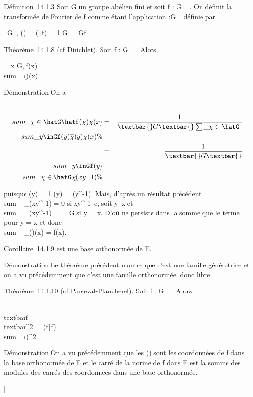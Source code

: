 \documentclass[]{article}
\begin{document}
Définition~14.1.3 Soit G un groupe abélien fini et soit f : G \rightarrow~ . On
définit la transformée de Fourier de f comme étant l'application
\hatf :\hat G \rightarrow~  définie par

\forall~\chi \in\hat G~,
\hatf(\chi) = (\chi∣f) =
1\over
\textbar{}G\textbar{}\int ~
\_Gf\overline\chi

Théorème~14.1.8 (cf Dirichlet). Soit f : G \rightarrow~ . Alors,

\forall~~x \in G, f(x) = \\sum
\_\chi\in\hatG\hatf(\chi)\chi(x)

Démonstration On a

\begin{align*} \\sum
\_\chi\in\hatG\hatf(\chi)\chi(x)&
=& 1 \over \textbar{}G\textbar{}
\sum \_\chi\in\hatG~
\\sum
\_y\inGf(y)\overline\chi(y)\chi(x)\%&
\\ & =& 1 \over
\textbar{}G\textbar{} \\sum
\_y\inGf(y)\\sum
\_\chi\in\hatG\chi(xy^-1) \%&
\\ \end{align*}

puisque \overline\chi(y) = 1 \over
\chi(y) = \chi(y^-1). Mais, d'après un résultat précédent
\\sum ~
\_\chi\in\hatG\chi(xy^-1) = 0 si
xy^-1\neq~e, soit
y\neq~x et
\\sum ~
\_\chi\in\hatG\chi(xy^-1) =
\textbar{}\hatG\textbar{} = \textbar{}G\textbar{} si
y = x. D'où ne persiste dans la somme que le terme pour y = x et donc
\\sum ~
\_\chi\in\hatG\hatf(\chi)\chi(x) =
f(x).

Corollaire~14.1.9 \hatG est une base orthonormée de
E.

Démonstration Le théorème précédent montre que c'est une famille
génératrice et on a vu précédemment que c'est une famille orthonormée,
donc libre.

Théorème~14.1.10 (cf Parseval-Plancherel). Soit f : G \rightarrow~ . Alors

\\textbar{}f\\textbar{}^2 =
(f∣f) = \\sum
\_\chi\in\hatG\textbar{}\hatf(\chi)\textbar{}^2

Démonstration On a vu précédemment que les \hatf(\chi)
sont les coordonnées de f dans la base orthonormée
\hatG de E et le carré de la norme de f dans E est la
somme des modules des carrés des coordonnées dans une base orthonormée.

{[}
{[}
\end{document}
